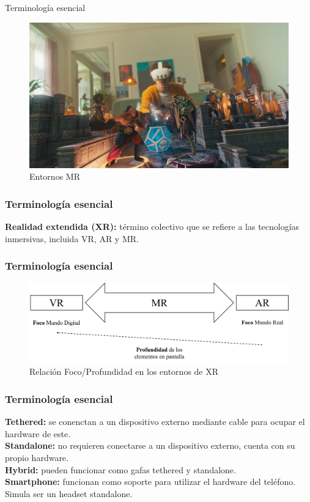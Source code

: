 \documentclass[aspectratio=169,17pt]{beamer}
\begin{document}
\begin{frame}{Terminología esencial}
\begin{figure}[ht]
\begin{minipage}[b]{0.30\linewidth}
                \centering
                \includegraphics[width=\textwidth]{Ilustración 3.jpg}
                \caption{Entornos MR}
                \label{Ilu3}
            \end{minipage}
        \end{figure}
    \end{frame}
    
    \begin{frame}
        \frametitle{Terminología esencial}
            \textbf{Realidad extendida (XR):} término colectivo que se refiere a las tecnologías inmersivas, incluida VR, AR y MR.
    \end{frame}

    \begin{frame}
        \frametitle{Terminología esencial}
            \begin{figure}
                \centering
                \includegraphics[width=1\linewidth]{Gráfica 1.png}
                \caption{Relación Foco/Profundidad en los entornos de XR}
                \label{Grá1}
            \end{figure}
    \end{frame}

    \begin{frame}
        \frametitle{Terminología esencial}
            \textbf{Tethered:} se conenctan a un dispositivo externo mediante cable para ocupar el hardware de este.\\
            \textbf{Standalone:} no requieren conectarse a un dispositivo externo, cuenta con su propio hardware.\\
            \textbf{Hybrid:} pueden funcionar como gafas tethered y standalone.\\
            \textbf{Smartphone:} funcionan como soporte para utilizar el hardware del teléfono. Simula ser un headset standalone.
    \end{frame}
\end{document}
